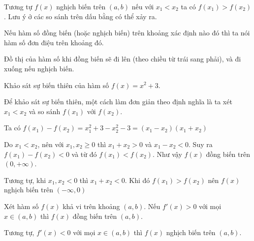 Tương tự $f(x)$ nghịch biến trên $(a, b)$ nếu với $x_1 < x_2$ ta có $f(x_1) > f(x_2)$.
Lưu ý ở các so sánh trên dấu bằng có thể xảy ra.

Nếu hàm số đồng biến (hoặc nghịch biến) trên khoảng xác định nào đó thì ta
nói hàm số đơn điệu trên khoảng đó.

Đồ thị của hàm số khi đồng biến sẽ đi lên (theo chiều từ trái sang phải), và đi
xuống nếu nghịch biến.

\begin{example}
    Khảo sát sự biến thiên của hàm số $f(x) = x^2 + 3$.

    Để khảo sát sự biến thiên, một cách làm đơn giản theo định nghĩa
    là ta xét $x_1 < x_2$ và so sánh $f(x_1)$ với $f(x_2)$.

    Ta có $f(x_1) - f(x_2) = x_1^2 + 3 - x_2^2 - 3 = (x_1 - x_2)(x_1 + x_2)$

    Do $x_1 < x_2$, nên với $x_1, x_2 \geq 0$ thì $x_1 + x_2 > 0$ và
    $x_1 - x_2 < 0$. Suy ra $f(x_1) - f(x_2) < 0$ và từ đó $f(x_1) < f(x_2)$. Như
    vậy $f(x)$ đồng biến trên $(0, +\infty)$.

    Tương tự, khi $x_1, x_2 < 0$ thì $x_1 + x_2 < 0$. Khi đó $f(x_1) > f(x_2)$
    nên $f(x)$ nghịch biến trên $(-\infty, 0)$
\end{example}

\begin{theorem}
    Xét hàm số $f(x)$ khả vi trên khoảng $(a, b)$. Nếu $f'(x) > 0$ 
    với mọi $x \in (a, b)$ thì $f(x)$ đồng biến trên $(a, b)$.
\end{theorem}

Tương tự, $f'(x) < 0$ với mọi $x \in (a, b)$ thì $f(x)$ nghịch biến trên
$(a, b)$.




